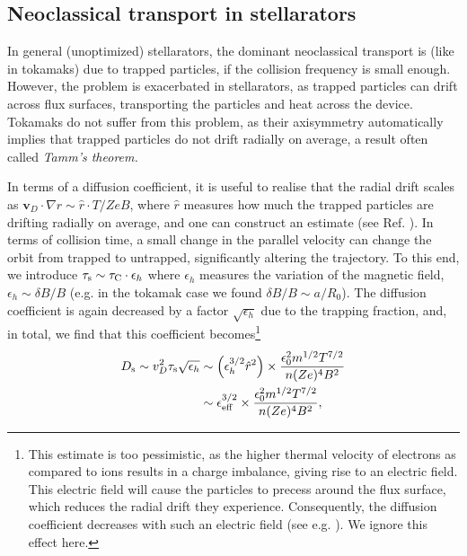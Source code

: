 \subsection{Neoclassical transport in stellarators}
In general (unoptimized) stellarators, the dominant neoclassical transport is (like in tokamaks) due to trapped particles, if the collision frequency is small enough. However, the problem is exacerbated in stellarators, as trapped particles can drift across flux surfaces, transporting the particles and heat across the device. Tokamaks do not suffer from this problem, as their axisymmetry automatically implies that trapped particles do not drift radially on average, a result often called \textit{Tamm's theorem.} \par 
In terms of a diffusion coefficient, it is useful to realise that the radial drift scales as $\boldsymbol{v}_D \cdot \nabla r \sim \hat{r} \cdot  T/Ze B$, where $\hat{r}$ measures how much the trapped particles are drifting radially on average, and one can construct an estimate (see Ref. \cite{helander2012stellarator}). In terms of collision time, a small change in the parallel velocity can change the orbit from trapped to untrapped, significantly altering the trajectory. To this end, we introduce $\tau_{\rm s} \sim \tau_{\rm C} \cdot \epsilon_{h}$ where $\epsilon_{h}$ measures the variation of the magnetic field, $\epsilon_{h} \sim \delta B/ B$ (e.g. in the tokamak case we found $\delta B/B \sim a/R_0$). The diffusion coefficient is again decreased by a factor $\sqrt{\epsilon_{h}}$ due to the trapping fraction, and, in total, we find that this coefficient becomes\footnote{This estimate is too pessimistic, as the higher thermal velocity of electrons as compared to ions results in a charge imbalance, giving rise to an electric field. This electric field will cause the particles to precess around the flux surface, which reduces the radial drift they experience. Consequently, the diffusion coefficient decreases with such an electric field (see e.g. \citet{beidler2011benchmarking}). We ignore this effect here.}
\begin{equation}
\begin{aligned}
    D_{\rm s} \sim v_D^2 \tau_{\rm s} \sqrt{\epsilon_{h}} & \sim \left( \epsilon_{h}^{3/2} \hat{r}^2 \right) \times \frac{\epsilon_0^2 m^{1/2} T^{7/2}}{n (Ze)^4 B^2}  \\
    &\sim  \epsilon_{\rm eff}^{3/2} \times \frac{\epsilon_0^2 m^{1/2} T^{7/2}}{n (Ze)^4 B^2},
\end{aligned}
\end{equation}
